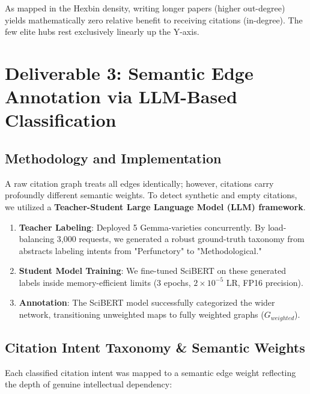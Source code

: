 As mapped in the Hexbin density, writing longer papers (higher out-degree) yields mathematically zero relative benefit to receiving citations (in-degree). The few elite hubs rest exclusively linearly up the Y-axis.


\section{Deliverable 3: Semantic Edge Annotation via LLM-Based Classification}

\subsection{Methodology and Implementation}
A raw citation graph treats all edges identically; however, citations carry profoundly different semantic weights. To detect synthetic and empty citations, we utilized a \textbf{Teacher-Student Large Language Model (LLM) framework}. 
\begin{enumerate}
    \item \textbf{Teacher Labeling}: Deployed 5 Gemma-varieties concurrently. By load-balancing 3,000 requests, we generated a robust ground-truth taxonomy from abstracts labeling intents from "Perfunctory" to "Methodological." 
    \item \textbf{Student Model Training}: We fine-tuned SciBERT on these generated labels inside memory-efficient limits (3 epochs, $2 \times 10^{-5}$ LR, FP16 precision).
    \item \textbf{Annotation}: The SciBERT model successfully categorized the wider network, transitioning unweighted maps to fully weighted graphs ($G_{weighted}$).
\end{enumerate}

\subsection{Citation Intent Taxonomy \& Semantic Weights}
Each classified citation intent was mapped to a semantic edge weight reflecting the depth of genuine intellectual dependency:

